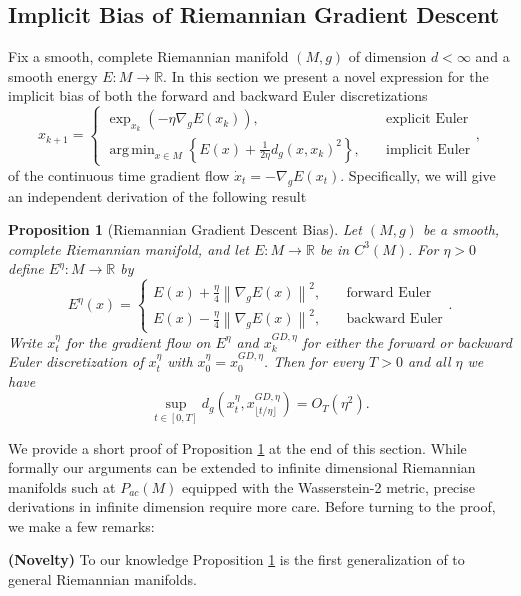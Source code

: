 \documentclass[reqno,11pt,letterpaper]{amsart}
\theoremstyle{plain}
\newtheorem{prop}{Proposition}
\theoremstyle{definition}
\theoremstyle{remark}
\DeclareMathOperator*{\argmin}{arg\,min}
\newcommand{\gives}{\rightarrow}
\newcommand{\R}{\mathbb R}
\newcommand{\lr}[1]{\left(#1\right)}
\newcommand{\norm}[1]{\left\lVert#1\right\rVert}
\newcommand{\set}[1]{\left\{#1\right\}}
\begin{document}
\subsection{Implicit Bias of Riemannian Gradient Descent}\label{sec:RGD_ImplicitBias}

Fix a smooth, complete Riemannian manifold $(M,g)$ of dimension $d<\infty$ and a smooth energy $E:M\gives \R$. In this section we present a novel expression for the implicit bias of both the forward and backward Euler discretizations 
\[
x_{k+1} = \begin{cases}
    \exp_{x_k}\lr{-\eta \nabla_g E(x_k)},&\quad\text{explicit Euler}\\
    \argmin_{x\in M} \set{E(x) + \frac{1}{2\eta}d_g(x,x_k)^2},&\quad \text{implicit Euler}
\end{cases},
\]
of the continuous time gradient flow $ \dot{x}_t = - \nabla_g E(x_t).$ Specifically, we will give an independent derivation of the following result 
\begin{prop}[Riemannian Gradient Descent Bias]\label{prop:implicit_riemann_cov}
    Let $(M, g)$ be a smooth, complete Riemannian manifold, and let $E:M\gives \R$ be in $C^3(M)$. For $\eta>0$ define $E^\eta:M\gives \R$ by
    \[
    E^{\eta}(x) = \begin{cases}
        E(x) + \frac{\eta}{4}\norm{\nabla_g E(x)}^2,&\quad \text{forward Euler}\\
        E(x) - \frac{\eta}{4}\norm{\nabla_g E(x)}^2,&\quad \text{backward Euler}
    \end{cases}.
    \]
    Write $x_t^\eta$ for the gradient flow on $E^\eta$ and $x_k^{GD,\eta}$ for either the forward or backward Euler discretization of $x_t^\eta$ with $x_0^\eta = x_0^{GD, \eta}$. Then for every $T>0$ and all $\eta$ we have
    \[
        \sup_{t\in [0,T]}d_g(x_{t}^\eta, x_{\lfloor t/\eta\rfloor}^{GD, \eta}) = O_T(\eta^2).
    \]
\end{prop}
We provide a short proof of Proposition \ref{prop:implicit_riemann_cov} at the end of this section. While formally our arguments can be extended to infinite dimensional Riemannian manifolds such at $P_{ac}(M)$ equipped with the Wasserstein-2 metric, precise derivations in infinite dimension require more care. Before turning to the proof, we make a few remarks:

\textbf{(Novelty)} To our knowledge Proposition \ref{prop:implicit_riemann_cov} is the first generalization of \cite{smith2021on,barrett2021implicit} to general Riemannian manifolds.
\end{document}
